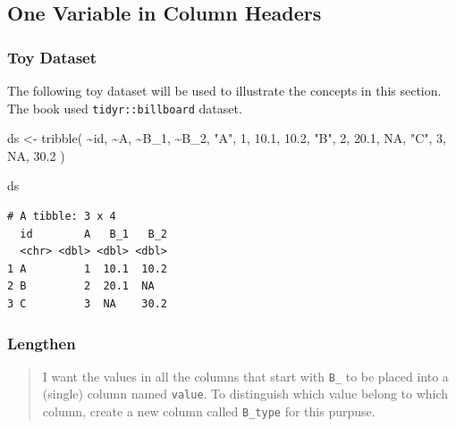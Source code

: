 \documentclass[
  letterpaper,
  DIV=11,
  numbers=noendperiod]{scrreprt}
\newenvironment{Shaded}{\begin{snugshade}}{\end{snugshade}}
\newcommand{\ConstantTok}[1]{\textcolor[rgb]{0.56,0.35,0.01}{#1}}
\newcommand{\DecValTok}[1]{\textcolor[rgb]{0.68,0.00,0.00}{#1}}
\newcommand{\FloatTok}[1]{\textcolor[rgb]{0.68,0.00,0.00}{#1}}
\newcommand{\FunctionTok}[1]{\textcolor[rgb]{0.28,0.35,0.67}{#1}}
\newcommand{\NormalTok}[1]{\textcolor[rgb]{0.00,0.23,0.31}{#1}}
\newcommand{\OtherTok}[1]{\textcolor[rgb]{0.00,0.23,0.31}{#1}}
\newcommand{\SpecialCharTok}[1]{\textcolor[rgb]{0.37,0.37,0.37}{#1}}
\newcommand{\StringTok}[1]{\textcolor[rgb]{0.13,0.47,0.30}{#1}}
\begin{document}
\subsection{One Variable in Column
Headers}\label{one-variable-in-column-headers}

\subsubsection{Toy Dataset}\label{toy-dataset}

The following toy dataset will be used to illustrate the concepts in
this section. The book used \texttt{tidyr::billboard} dataset.

\begin{Shaded}
\begin{Highlighting}[]
\NormalTok{ds }\OtherTok{\textless{}{-}} \FunctionTok{tribble}\NormalTok{(}
  \SpecialCharTok{\textasciitilde{}}\NormalTok{id, }\SpecialCharTok{\textasciitilde{}}\NormalTok{A, }\SpecialCharTok{\textasciitilde{}}\NormalTok{B\_1, }\SpecialCharTok{\textasciitilde{}}\NormalTok{B\_2,}
  \StringTok{"A"}\NormalTok{, }\DecValTok{1}\NormalTok{, }\FloatTok{10.1}\NormalTok{, }\FloatTok{10.2}\NormalTok{,}
  \StringTok{"B"}\NormalTok{, }\DecValTok{2}\NormalTok{, }\FloatTok{20.1}\NormalTok{, }\ConstantTok{NA}\NormalTok{,}
  \StringTok{"C"}\NormalTok{, }\DecValTok{3}\NormalTok{, }\ConstantTok{NA}\NormalTok{, }\FloatTok{30.2}
\NormalTok{)}

\NormalTok{ds}
\end{Highlighting}
\end{Shaded}

\begin{verbatim}
# A tibble: 3 x 4
  id        A   B_1   B_2
  <chr> <dbl> <dbl> <dbl>
1 A         1  10.1  10.2
2 B         2  20.1  NA  
3 C         3  NA    30.2
\end{verbatim}

\subsubsection{Lengthen}\label{lengthen}

\begin{quote}
I want the values in all the columns that start with \texttt{B\_} to be
placed into a (single) column named \texttt{value}. To distinguish which
value belong to which column, create a new column called
\texttt{B\_type} for this purpuse.
\end{quote}
\end{document}
